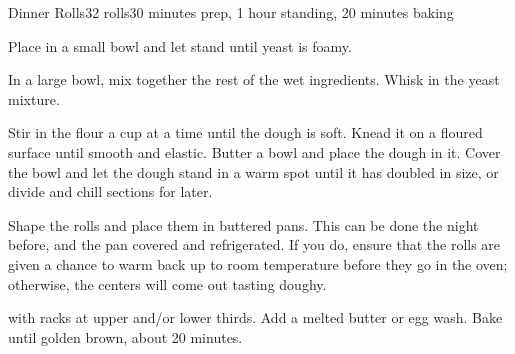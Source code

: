 \documentclass[../Cookbook.tex]{subfiles}
\begin{document}
\begin{recipe}[DinnerRolls]{Dinner Rolls}{32 rolls}{30 minutes prep, 1 hour standing, 20 minutes baking}

Place in a small bowl and let stand until yeast is foamy.

In a large bowl, mix together the rest of the wet ingredients. 
Whisk in the yeast mixture.

Stir in the flour a cup at a time until the dough is soft. 
Knead it on a floured surface until smooth and elastic. 
Butter a bowl and place the dough in it. 
Cover the bowl and let the dough stand in a warm spot until it has doubled in size, or divide and chill sections for later.

\newstep
Shape the rolls and place them in buttered pans.
This can be done the night before, and the pan covered and refrigerated.
If you do, ensure that the rolls are given a chance to warm back up to room temperature before they go in the oven; otherwise, the centers will come out tasting doughy.

 with racks at upper and/or lower thirds. 
Add a melted butter or egg wash. 
Bake until golden brown, about 20 minutes.

\end{recipe}
\end{document}
